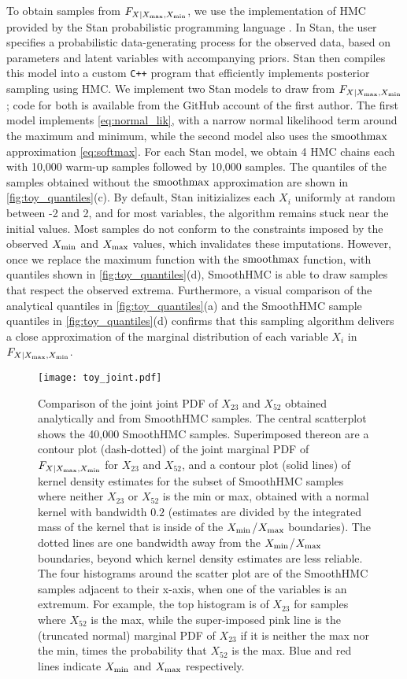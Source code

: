 To obtain samples from \(F_{X \mid X_{\max},X_{\min}}\), we use the implementation of HMC provided by the Stan probabilistic programming language \citep{stancite}.
In Stan, the user specifies a probabilistic data-generating process for the observed data, based on parameters and latent variables with accompanying priors.
Stan then compiles this model into a custom \texttt{C++} program that efficiently implements
posterior sampling using HMC.
We implement two Stan models to draw from \(F_{X \mid X_{\max},X_{\min}}\);
code for both is available from the GitHub account of the first author.
The first model implements \autoref{eq:normal_lik},
with a narrow normal likelihood term around the maximum and minimum,
while the second model also uses the \(\operatorname*{smoothmax}\) approximation \autoref{eq:softmax}.
For each Stan model, we obtain 4 HMC chains each with 10,000 warm-up samples followed by 10,000 samples.
The quantiles of the samples obtained without the \(\operatorname*{smoothmax}\) approximation are shown in \autoref{fig:toy_quantiles}(c).
By default, Stan initizializes each \(X_i\) uniformly at random between -2 and 2,
and for most variables, the algorithm remains stuck near the initial values.
Most samples do not conform to the constraints imposed by the observed \(X_{\min}\) and \(X_{\max}\) values, which invalidates these imputations.
However, once we replace the maximum function with the \(\operatorname*{smoothmax}\) function,
with quantiles shown in \autoref{fig:toy_quantiles}(d),
SmoothHMC is able to draw samples that respect the observed extrema.
Furthermore, a visual comparison of the analytical quantiles in \autoref{fig:toy_quantiles}(a)
and the SmoothHMC sample quantiles in \autoref{fig:toy_quantiles}(d) confirms that
this sampling algorithm delivers a close approximation of the marginal distribution of each variable \(X_i\) in \(F_{X \mid X_{\max},X_{\min}}\).
    
\begin{figure}[tbp]
\centering
\texttt{[image: toy\_joint.pdf]}
\caption{\label{fig:toy_joint}
Comparison of the joint joint PDF of \(X_{23}\) and \(X_{52}\)
obtained analytically and from SmoothHMC samples.
The central scatterplot shows the 40,000 SmoothHMC samples.
Superimposed thereon are a contour plot (dash-dotted) of the joint marginal PDF of \(F_{X \mid X_{\max},X_{\min}}\) for \(X_{23}\) and \(X_{52}\),
and a contour plot (solid lines) of kernel density estimates for the subset of SmoothHMC samples where neither \(X_{23}\) or \(X_{52}\) is the min or max,
obtained with a normal kernel with bandwidth \(0.2\)
(estimates are divided by the integrated mass of the kernel that is inside of the \(X_{\min}\)/\(X_{\max}\) boundaries).
The dotted lines are one bandwidth away from the \(X_{\min}\)/\(X_{\max}\) boundaries, beyond which kernel density estimates are less reliable.
The four histograms around the scatter plot are of the SmoothHMC samples adjacent to their x-axis, when one of the variables is an extremum.
For example, the top histogram is of \(X_{23}\) for samples where \(X_{52}\) is the max, 
while the super-imposed pink line is the (truncated normal) marginal PDF of \(X_{23}\) if it is neither the max nor the min,
times the probability that \(X_{52}\) is the max.
Blue and red lines indicate \(X_{\min}\) and \(X_{\max}\) respectively.
}
\end{figure}
    
